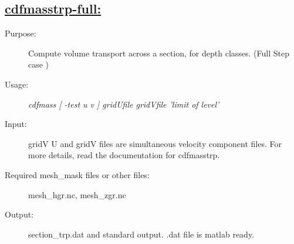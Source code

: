 \documentclass[a4paper,11pt]{article}
\begin{document}
\subsection*{\underline{cdfmasstrp-full:}}
\begin{description}
\item[Purpose:] Compute volume transport across a section, for depth classes. (Full  Step case )
\item[Usage:] {\em cdfmass [ -test u v ]  gridUfile gridVfile  'limit of level' }
\item[Input:]  gridV U and gridV files are simultaneous velocity component files. For more details, read the documentation for
     cdfmasstrp.
\item[Required mesh\_mask files or other files:]   mesh\_hgr.nc, mesh\_zgr.nc
\item[Output:]section\_trp.dat and standard output. .dat file is matlab ready.
\end{description}


\newpage
\end{document}

